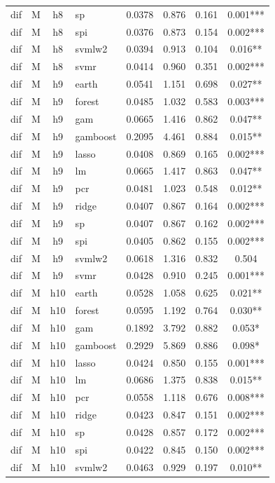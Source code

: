 \begin{ThreePartTable}
\begin{longtable}[t]{llclcccc}
dif & M & h8 & sp & 0.0378 & 0.876 & 0.161 & 0.001***\\
dif & M & h8 & spi & 0.0376 & 0.873 & 0.154 & 0.002***\\
dif & M & h8 & svmlw2 & 0.0394 & 0.913 & 0.104 & 0.016**\\
dif & M & h8 & svmr & 0.0414 & 0.960 & 0.351 & 0.002***\\
\addlinespace
dif & M & h9 & earth & 0.0541 & 1.151 & 0.698 & 0.027**\\
dif & M & h9 & forest & 0.0485 & 1.032 & 0.583 & 0.003***\\
dif & M & h9 & gam & 0.0665 & 1.416 & 0.862 & 0.047**\\
dif & M & h9 & gamboost & 0.2095 & 4.461 & 0.884 & 0.015**\\
dif & M & h9 & lasso & 0.0408 & 0.869 & 0.165 & 0.002***\\
dif & M & h9 & lm & 0.0665 & 1.417 & 0.863 & 0.047**\\
dif & M & h9 & pcr & 0.0481 & 1.023 & 0.548 & 0.012**\\
dif & M & h9 & ridge & 0.0407 & 0.867 & 0.164 & 0.002***\\
dif & M & h9 & sp & 0.0407 & 0.867 & 0.162 & 0.002***\\
dif & M & h9 & spi & 0.0405 & 0.862 & 0.155 & 0.002***\\
dif & M & h9 & svmlw2 & 0.0618 & 1.316 & 0.832 & 0.504\\
dif & M & h9 & svmr & 0.0428 & 0.910 & 0.245 & 0.001***\\
\addlinespace
dif & M & h10 & earth & 0.0528 & 1.058 & 0.625 & 0.021**\\
dif & M & h10 & forest & 0.0595 & 1.192 & 0.764 & 0.030**\\
dif & M & h10 & gam & 0.1892 & 3.792 & 0.882 & 0.053*\\
dif & M & h10 & gamboost & 0.2929 & 5.869 & 0.886 & 0.098*\\
dif & M & h10 & lasso & 0.0424 & 0.850 & 0.155 & 0.001***\\
dif & M & h10 & lm & 0.0686 & 1.375 & 0.838 & 0.015**\\
dif & M & h10 & pcr & 0.0558 & 1.118 & 0.676 & 0.008***\\
dif & M & h10 & ridge & 0.0423 & 0.847 & 0.151 & 0.002***\\
dif & M & h10 & sp & 0.0428 & 0.857 & 0.172 & 0.002***\\
dif & M & h10 & spi & 0.0422 & 0.845 & 0.150 & 0.002***\\
dif & M & h10 & svmlw2 & 0.0463 & 0.929 & 0.197 & 0.010**\\

\end{longtable}
\end{ThreePartTable}
